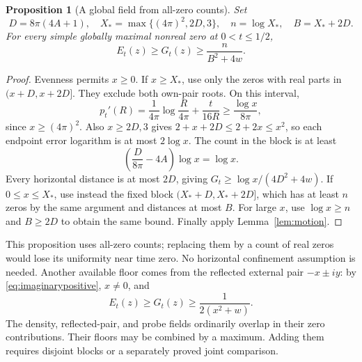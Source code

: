 \documentclass[11pt]{article}
\numberwithin{equation}{section}
\newtheorem{proposition}[theorem]{Proposition}
\theoremstyle{definition}
\theoremstyle{remark}
\begin{document}
\begin{proposition}[A global field from all-zero counts]\label{prop:countfloor}
Set
\begin{equation}\label{eq:countparameters}
 D=8\pi(4A+1),\quad X_* =\max\{(4\pi)^2,2D,3\},
 \quad n=\log X_*,\quad B=X_*+2D.
\end{equation}
For every simple globally maximal nonreal zero at $0<t\le1/2$,
\begin{equation}\label{eq:globalfloor}
 E_t(z)\ge G_t(z)\ge\frac{n}{B^2+4w}.
\end{equation}
\end{proposition}
\begin{proof}
Evenness permits $x\ge0$. If $x\ge X_*$, use only the zeros with
real parts in $(x+D,x+2D]$. They exclude both own-pair roots. On
this interval,
\[
 p_t'(R)=\frac1{4\pi}\log\frac R{4\pi}+\frac{t}{16R}
 \ge\frac{\log x}{8\pi},
\]
since $x\ge(4\pi)^2$. Also $x\ge2D,3$ gives
$2+x+2D\le2+2x\le x^2$, so each endpoint error logarithm is at
most $2\log x$. The count in the block is at least
\[
 \left(\frac{D}{8\pi}-4A\right)\log x=\log x.
\]
Every horizontal distance is at most $2D$, giving
$G_t\ge\log x/(4D^2+4w)$. If $0\le x\le X_*$, use instead
the fixed block $(X_*+D,X_*+2D]$, which has at least $n$ zeros
by the same argument and distances at most $B$. For large $x$,
use $\log x\ge n$ and $B\ge2D$ to obtain the same bound.
Finally apply Lemma~\ref{lem:motion}.
\end{proof}

This proposition uses all-zero counts; replacing them by a count
of real zeros would lose its uniformity near time zero. No horizontal
confinement assumption is needed. Another available floor comes
from the reflected external pair $-x\pm iy$: by
\eqref{eq:imaginarypositive}, $x\ne0$, and
\begin{equation}\label{eq:mirrorfloor}
 E_t(z)\ge G_t(z)\ge\frac1{2(x^2+w)}.
\end{equation}
The density, reflected-pair, and probe fields ordinarily overlap in
their zero contributions. Their floors may be combined by a maximum.
Adding them requires disjoint blocks or a separately proved joint
comparison.
\end{document}
